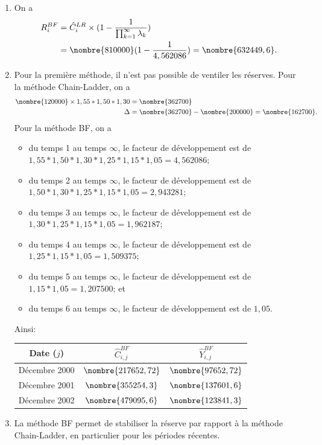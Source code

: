 \begin{exercice}
\begin{sol}
\begin{enumerate}
    \item On a
      \begin{align*}
        R_i^{BF} &= \hat{C}_{i}^{LR} \times ( 1 - \frac{1}{\prod_{k=1}^{\infty} \lambda_k}) \\
                 &= \nombre{810000} (1-\frac{1}{4,562086}) = \nombre{632449,6}.
      \end{align*}
    \item Pour la première méthode, il n'est pas possible de ventiler
      les réserves. Pour la méthode Chain-Ladder, on a
      \begin{align*}
        \nombre{120000} \times 1,55 * 1,50 * 1,30 &= \nombre{362700}\\
        \Delta &= \nombre{362700} - \nombre{200000} = \nombre{162700}.
      \end{align*}
      Pour la méthode BF, on a
      \begin{itemize}
      \item du temps 1 au temps $\infty$, le facteur de développement
        est de $1,55 * 1,50 * 1,30 * 1,25 * 1,15 * 1,05 = 4,562086$;
      \item du temps 2 au temps $\infty$, le facteur de développement
        est de $1,50 * 1,30 * 1,25 * 1,15 * 1,05 = 2,943281$;
      \item du temps 3 au temps $\infty$, le facteur de développement
        est de $1,30 * 1,25 * 1,15 * 1,05 = 1,962187$;
      \item du temps 4 au temps $\infty$, le facteur de développement
        est de $1,25 * 1,15 * 1,05 = 1,509375$;
      \item du temps 5 au temps $\infty$, le facteur de développement
        est de $1,15 * 1,05 = 1,207500$; et
      \item du temps 6 au temps $\infty$, le facteur de développement
        est de $1,05$.
      \end{itemize}
      Ainsi:
      \begin{center}
        \begin{tabular}{|c|c|c|}\hline
          Date ($j$) & $\hat{C}_{i,j}^{BF}$ & $\hat{Y}_{i,j}^{BF}$  \\ \hline
          Décembre 2000 &  $\nombre{217652,72}$ & $\nombre{97652,72}$ \\ \hline
          Décembre 2001 &  $\nombre{355254,3}$ & $\nombre{137601,6}$\\ \hline
          Décembre 2002 &  $\nombre{479095,6}$ & $\nombre{123841,3}$\\ \hline
        \end{tabular}
      \end{center}
    \item La méthode BF permet de stabiliser la réserve par rapport à
      la méthode Chain-Ladder, en particulier pour les périodes
      récentes.
    \end{enumerate}
  \end{sol}
\end{exercice}

